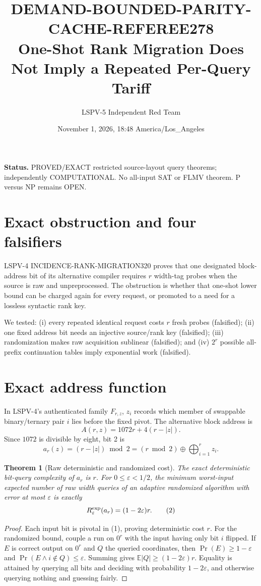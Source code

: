 \documentclass[11pt]{article}
\title{DEMAND-BOUNDED-PARITY-CACHE-REFEREE278\\
\large One-Shot Rank Migration Does Not Imply a Repeated Per-Query Tariff}
\author{LSPV-5 Independent Red Team}
\date{November 1, 2026, 18:48 America/Los\_Angeles}
\newtheorem{theorem}{Theorem}
\begin{document}
\maketitle

\noindent\textbf{Status.} PROVED/EXACT restricted source-layout query
theorems; independently COMPUTATIONAL. No all-input SAT or FLMV theorem.
P versus NP remains OPEN.

\section{Exact obstruction and four falsifiers}
LSPV-4 INCIDENCE-RANK-MIGRATION320 proves that one designated block-address
bit of its alternative compiler requires $r$ width-tag probes when the source
is raw and unpreprocessed. The obstruction is whether that one-shot lower
bound can be charged again for every request, or promoted to a need for a
lossless syntactic rank key.

We tested: (i) every repeated identical request costs $r$ fresh probes
(falsified); (ii) one fixed address bit needs an injective source/rank key
(falsified); (iii) randomization makes raw acquisition sublinear (falsified);
and (iv) $2^r$ possible all-prefix continuation tables imply exponential
work (falsified).

\section{Exact address function}
In LSPV-4's authenticated family $F_{r,z}$, $z_i$ records which member of
swappable binary/ternary pair $i$ lies before the fixed pivot. The alternative
block address is
\[
 A(r,z)=1072r+4(r-|z|).
\]
Since $1072$ is divisible by eight, bit 2 is
\[
 a_r(z)= (r-|z|)\bmod2=(r\bmod2)\oplus
 \bigoplus_{i=1}^r z_i.                                      \tag{1}
\]

\begin{theorem}[Raw deterministic and randomized cost]
The exact deterministic bit-query complexity of $a_r$ is $r$. For
$0\le\varepsilon<1/2$, the minimum worst-input expected number of raw width
queries of an adaptive randomized algorithm with error at most $\varepsilon$
is exactly
\[
 R^{\rm exp}_\varepsilon(a_r)=(1-2\varepsilon)r.              \tag{2}
\]
\end{theorem}
\begin{proof}
Each input bit is pivotal in (1), proving deterministic cost $r$. For the
randomized bound, couple a run on $0^r$ with the input having only bit $i$
flipped. If $E$ is correct output on $0^r$ and $Q$ the queried coordinates,
then $\Pr(E)\ge1-\varepsilon$ and
$\Pr(E\land i\notin Q)\le\varepsilon$. Summing gives
$\mathbb E|Q|\ge(1-2\varepsilon)r$. Equality is attained by querying all
bits and deciding with probability $1-2\varepsilon$, and otherwise querying
nothing and guessing fairly.
\end{proof}
\end{document}
